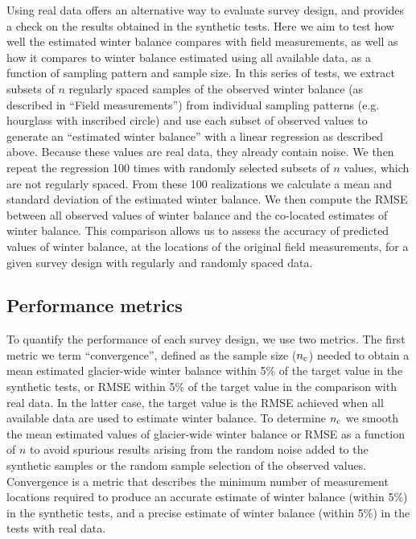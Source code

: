 \documentclass{article}
\begin{document}
 Using real data offers an alternative way to evaluate survey design, and provides a check on the results obtained in the synthetic tests. 
Here we aim to test how well the estimated winter balance compares with field measurements, as well as how it compares to winter balance estimated using all available data, as a function of sampling pattern and sample size. 
In this series of tests, we extract subsets of $n$ regularly spaced samples of the observed winter balance (as described in ``Field measurements'') from individual sampling patterns (e.g. hourglass with inscribed circle) and use each subset of observed values to generate an ``estimated winter balance'' with a linear regression as described above. Because these values are real data, they already contain noise. 
We then repeat the regression 100 times with randomly selected subsets of $n$ values, which are not regularly spaced. From these 100 realizations we calculate a mean and standard deviation of the estimated winter balance. We then compute the RMSE between all observed values of winter balance and the co-located estimates of winter balance. This comparison allows us to assess the accuracy of predicted values of winter balance, at the locations of the original field measurements, for a given survey design with regularly and randomly spaced data. 


 \subsection{Performance metrics}
 
To quantify the performance of each survey design, we use two metrics. The first metric we term ``convergence'', defined as the sample size ($n_{\rm c}$) needed to obtain a mean estimated glacier-wide winter balance within 5\% of the target value in the synthetic tests, or RMSE within 5\% of the target value in the comparison with real data. In the latter case, the target value is the RMSE achieved when all available data are used to estimate winter balance.
To determine $n_{\rm c}$ we smooth the mean estimated values of glacier-wide winter balance or RMSE as a function of $n$ to avoid spurious results arising from the random noise added to the synthetic samples or the random sample selection of the observed values.
Convergence is a metric that describes the minimum number of measurement locations required to produce an accurate estimate of winter balance (within 5\%) in the synthetic tests, and a precise estimate of winter balance (within 5\%) in the tests with real data. 
\end{document}
